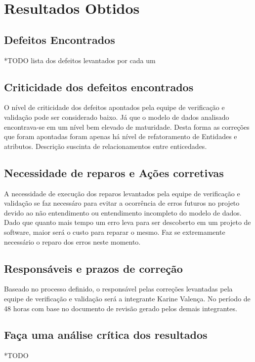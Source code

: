 \chapter[Resultados Obtidos]{Resultados Obtidos}

\section{Defeitos Encontrados}

*TODO lista dos defeitos levantados por cada um

\section{Criticidade dos defeitos encontrados}

O nível de criticidade dos defeitos apontados pela equipe de verificação e validação pode ser
considerado baixo. Já que o modelo de dados analisado encontrava-se em um nível bem elevado de maturidade.
Desta forma as correções que foram apontadas foram apenas há nível de refatoramento de Entidades e atributos.
Descrição suscinta de relacionamentos entre enticedades.

\section{Necessidade de reparos e Ações corretivas}

A necessidade de execução dos reparos levantados pela equipe de verificação e validação se faz necessáro para evitar
a ocorrência de erros futuros no projeto devido ao não entendimento ou entendimento incompleto do modelo de dados.
Dado que quanto mais tempo um erro leva para ser descoberto em um projeto de software, maior será o custo para reparar o mesmo.
Faz se extremamente necessário o reparo dos erros neste momento.

\section{Responsáveis e prazos de correção}

Baseado no processo definido, o responsável pelas correções levantadas pela equipe de verificação e validação será a integrante Karine
Valença. No período de 48 horas com base no documento de revisão gerado pelos demais integrantes.

\section{Faça uma análise crítica dos resultados}

*TODO
